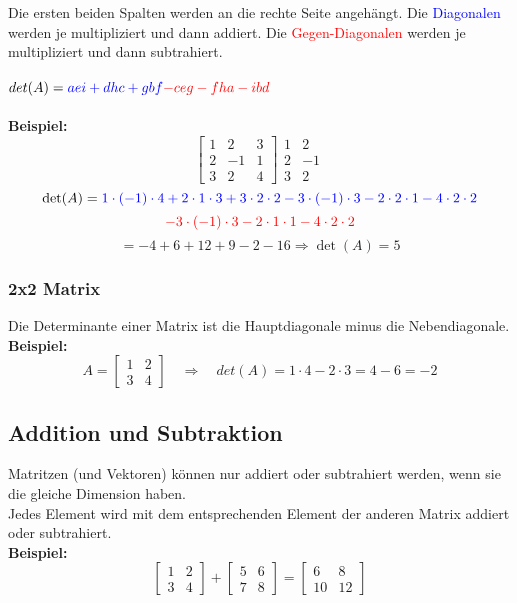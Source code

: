 \documentclass[12pt,a4paper]{article}
\begin{document}
Die ersten beiden Spalten werden an die rechte Seite angehängt. Die \textcolor{blue}{Diagonalen} werden je multipliziert und dann addiert. Die \textcolor{red}{Gegen-Diagonalen} werden je multipliziert und dann subtrahiert. \\ \\
$det(A) = \textcolor{blue}{aei + dhc + gbf} \textcolor{red}{- ceg - fha - ibd}$ \\ \\
\textbf{Beispiel:}
\[
\begin{bmatrix}
    1 & 2 & 3 \\
    2 & -1 & 1 \\
    3 & 2 & 4
\end{bmatrix}
\begin{matrix}
    1 & 2 \\
    2 & -1 \\
    3 & 2
\end{matrix}
\]
\[
\det(A) = \textcolor{blue}{1 \cdot (-1) \cdot 4 + 2 \cdot 1 \cdot 3 + 3 \cdot 2 \cdot 2 - 3 \cdot (-1) \cdot 3 - 2 \cdot 2 \cdot 1 - 4 \cdot 2 \cdot 2}
\]
\[
\textcolor{red}{-3 \cdot (-1) \cdot 3 - 2 \cdot 1 \cdot 1 - 4 \cdot 2 \cdot 2}
\]
\[
=-4 + 6 + 12 + 9 - 2 - 16 \Rightarrow \det(A) = 5
\]

\subsubsection{2x2 Matrix}
Die Determinante einer Matrix ist die Hauptdiagonale minus die Nebendiagonale. \\
\textbf{Beispiel:}
\[
A = 
\begin{bmatrix}
1 & 2 \\
3 & 4
\end{bmatrix}
\quad
\Rightarrow
\quad
det(A) = 1 \cdot 4 - 2 \cdot 3 = 4 - 6 = -2
\]

\subsection{Addition und Subtraktion}
Matritzen (und Vektoren) können nur addiert oder subtrahiert werden, wenn sie die gleiche Dimension haben. \\
Jedes Element wird mit dem entsprechenden Element der anderen Matrix addiert oder subtrahiert. \\
\textbf{Beispiel:}
\[
\begin{bmatrix}
1 & 2 \\
3 & 4
\end{bmatrix}
+
\begin{bmatrix}
5 & 6 \\
7 & 8
\end{bmatrix}
=
\begin{bmatrix}
6 & 8 \\
10 & 12
\end{bmatrix}
\]
\end{document}
